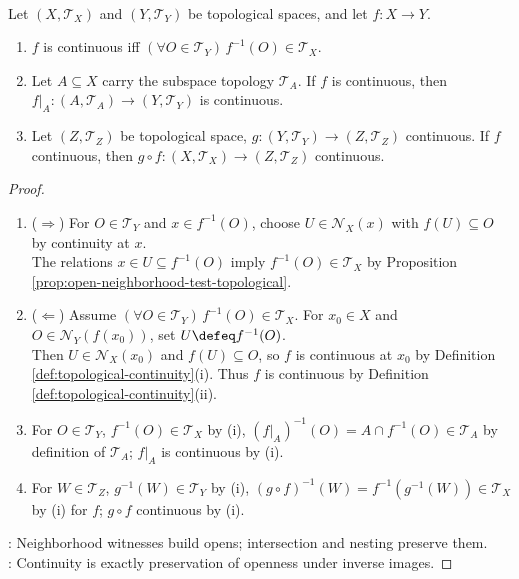 \begin{proposition} \label{prop:topological-continuity-open-preimages} \\
Let $(X,\mathcal{T}_X)$ and $(Y,\mathcal{T}_Y)$ be topological spaces, and let $f:X\to Y$.
\begin{enumerate}[label=(\roman*)]
\setlength{\itemsep}{0pt}
\item $f$ is continuous iff $(\forall O\in\mathcal{T}_Y)\,f^{-1}(O)\in\mathcal{T}_X$.
\item Let $A\subseteq X$ carry the subspace topology $\mathcal{T}_A$. If $f$ is continuous, then $f|_A:(A,\mathcal{T}_A)\to(Y,\mathcal{T}_Y)$ is continuous.
\item Let $(Z,\mathcal{T}_Z)$ be topological space, $g:(Y,\mathcal{T}_Y)\to(Z,\mathcal{T}_Z)$ continuous. If $f$ continuous, then $g\circ f:(X,\mathcal{T}_X)\to(Z,\mathcal{T}_Z)$ continuous.
\end{enumerate}
\begin{proof}
\begin{enumerate}[label=(\roman*)]
\setlength{\itemsep}{0pt}
\item[$(i)$] ($\Rightarrow$) For $O\in\mathcal{T}_Y$ and $x\in f^{-1}(O)$, choose $U\in\mathcal{N}_X(x)$ with $f(U)\subseteq O$ by continuity at $x$.\\
The relations $x\in U\subseteq f^{-1}(O)$ imply $f^{-1}(O)\in\mathcal{T}_X$ by Proposition \ref{prop:open-neighborhood-test-topological}.
\item[$(i)$] ($\Leftarrow$) Assume $(\forall O\in\mathcal{T}_Y)\,f^{-1}(O)\in\mathcal{T}_X$. For $x_0\in X$ and $O\in\mathcal{N}_Y(f(x_0))$, set $U\defeq f^{-1}(O)$.\\
Then $U\in\mathcal{N}_X(x_0)$ and $f(U)\subseteq O$, so $f$ is continuous at $x_0$ by Definition \ref{def:topological-continuity}(i). Thus $f$ is continuous by Definition \ref{def:topological-continuity}(ii).
\item[$(ii)$] For $O\in\mathcal{T}_Y$, $f^{-1}(O)\in\mathcal{T}_X$ by (i), $(f|_A)^{-1}(O)=A\cap f^{-1}(O)\in\mathcal{T}_A$ by definition of $\mathcal{T}_A$; $f|_A$ is continuous by (i).
\item[$(iii)$] For $W\in\mathcal{T}_Z$, $g^{-1}(W)\in\mathcal{T}_Y$ by (i), $(g\circ f)^{-1}(W)=f^{-1}(g^{-1}(W))\in\mathcal{T}_X$ by (i) for $f$; $g\circ f$ continuous by (i).
\end{enumerate}
: Neighborhood witnesses build opens; intersection and nesting preserve them.\\
: Continuity is exactly preservation of openness under inverse images.
\end{proof}
\end{proposition}

